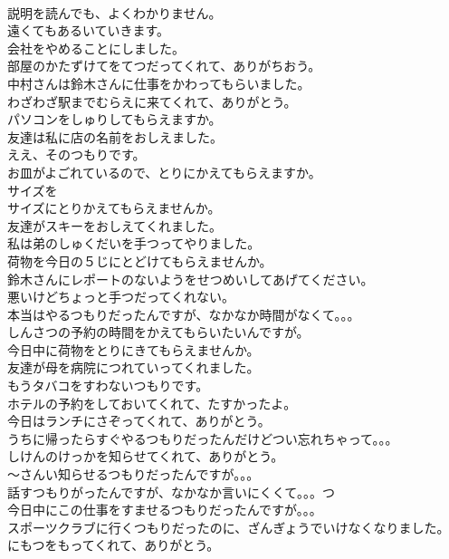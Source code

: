 \documentclass[8pt]{extreport}
\begin{document}
\begin{CJK}{UTF8}{min}
\\	説明を読んでも、よくわかりません。
\\	遠くてもあるいていきます。
\\	会社をやめることにしました。
\\	部屋のかたずけてをてつだってくれて、ありがちおう。
\\	中村さんは鈴木さんに仕事をかわってもらいました。
\\	わざわざ駅までむらえに来てくれて、ありがとう。
\\	パソコンをしゅりしてもらえますか。
\\	友達は私に店の名前をおしえました。
\\	ええ、そのつもりです。
\\	お皿がよごれているので、とりにかえてもらえますか。
\\	サイズを
\\	サイズにとりかえてもらえませんか。
\\	友達がスキーをおしえてくれました。
\\	私は弟のしゅくだいを手つってやりました。
\\	荷物を今日の５じにとどけてもらえませんか。
\\	鈴木さんにレポートのないようをせつめいしてあげてください。
\\	悪いけどちょっと手つだってくれない。
\\	本当はやるつもりだったんですが、なかなか時間がなくて。。。
\\	しんさつの予約の時間をかえてもらいたいんですが。
\\	今日中に荷物をとりにきてもらえませんか。
\\	友達が母を病院につれていってくれました。
\\	もうタバコをすわないつもりです。
\\	ホテルの予約をしておいてくれて、たすかったよ。
\\	今日はランチにさぞってくれて、ありがとう。
\\	うちに帰ったらすぐやるつもりだったんだけどつい忘れちゃって。。。
\\	しけんのけっかを知らせてくれて、ありがとう。
\\	～さんい知らせるつもりだったんですが。。。
\\	話すつもりがったんですが、なかなか言いにくくて。。。つ
\\	今日中にこの仕事をすませるつもりだったんですが。。。
\\	スポーツクラブに行くつもりだったのに、ざんぎょうでいけなくなりました。
\\	にもつをもってくれて、ありがとう。

\end{CJK}
\end{document}
